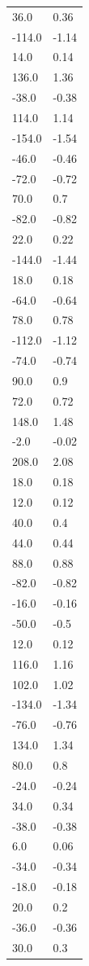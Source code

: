 \begin{longtable}{ll}
36.0 & 0.36 \\
-114.0 & -1.14 \\
14.0 & 0.14 \\
136.0 & 1.36 \\
-38.0 & -0.38 \\
114.0 & 1.14 \\
-154.0 & -1.54 \\
-46.0 & -0.46 \\
-72.0 & -0.72 \\
70.0 & 0.7 \\
-82.0 & -0.82 \\
22.0 & 0.22 \\
-144.0 & -1.44 \\
18.0 & 0.18 \\
-64.0 & -0.64 \\
78.0 & 0.78 \\
-112.0 & -1.12 \\
-74.0 & -0.74 \\
90.0 & 0.9 \\
72.0 & 0.72 \\
148.0 & 1.48 \\
-2.0 & -0.02 \\
208.0 & 2.08 \\
18.0 & 0.18 \\
12.0 & 0.12 \\
40.0 & 0.4 \\
44.0 & 0.44 \\
88.0 & 0.88 \\
-82.0 & -0.82 \\
-16.0 & -0.16 \\
-50.0 & -0.5 \\
12.0 & 0.12 \\
116.0 & 1.16 \\
102.0 & 1.02 \\
-134.0 & -1.34 \\
-76.0 & -0.76 \\
134.0 & 1.34 \\
80.0 & 0.8 \\
-24.0 & -0.24 \\
34.0 & 0.34 \\
-38.0 & -0.38 \\
6.0 & 0.06 \\
-34.0 & -0.34 \\
-18.0 & -0.18 \\
20.0 & 0.2 \\
-36.0 & -0.36 \\
30.0 & 0.3 \\

\end{longtable}
